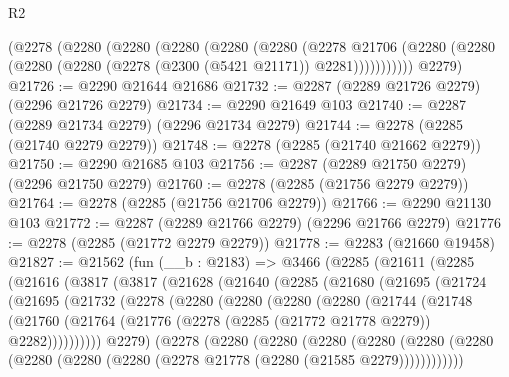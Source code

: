 \begin{lexlean}{R2}
\begin{coremodule}
    (@2278
      (@2280
        (@2280
          (@2280
            (@2280
              (@2280
                (@2278
                  @21706
                  (@2280 (@2280 (@2280 (@2280 (@2278 (@2300 (@5421 @21171)) @2281)))))))))))
      @2279)
@21726 := @2290 @21644 @21686
@21732 := @2287 (@2289 @21726 @2279) (@2296 @21726 @2279)
@21734 := @2290 @21649 @103
@21740 := @2287 (@2289 @21734 @2279) (@2296 @21734 @2279)
@21744 := @2278 (@2285 (@21740 @2279 @2279))
@21748 := @2278 (@2285 (@21740 @21662 @2279))
@21750 := @2290 @21685 @103
@21756 := @2287 (@2289 @21750 @2279) (@2296 @21750 @2279)
@21760 := @2278 (@2285 (@21756 @2279 @2279))
@21764 := @2278 (@2285 (@21756 @21706 @2279))
@21766 := @2290 @21130 @103
@21772 := @2287 (@2289 @21766 @2279) (@2296 @21766 @2279)
@21776 := @2278 (@2285 (@21772 @2279 @2279))
@21778 := @2283 (@21660 @19458)
@21827 := @21562
    (fun (__b : @2183) =>
    @3466
      (@2285
        (@21611
          (@2285
            (@21616
              (@3817
                (@3817
                  (@21628
                    (@21640
                      (@2285
                        (@21680
                          (@21695
                            (@21724
                              (@21695
                                (@21732
                                  (@2278
                                    (@2280
                                      (@2280
                                        (@2280
                                          (@2280
                                            (@21744
                                              (@21748
                                                (@21760
                                                  (@21764
                                                    (@21776
                                                      (@2278
                                                        (@2285 (@21772 @21778 @2279))
                                                        @2282))))))))))
                                    @2279)
                                  (@2278
                                    (@2280
                                      (@2280
                                        (@2280
                                          (@2280
                                            (@2280
                                              (@2280
                                                (@2280
                                                  (@2280
                                                    (@2280
                                                      (@2278 @21778 (@2280 (@21585 @2279))))))))))))

\end{coremodule}
\end{lexlean}
